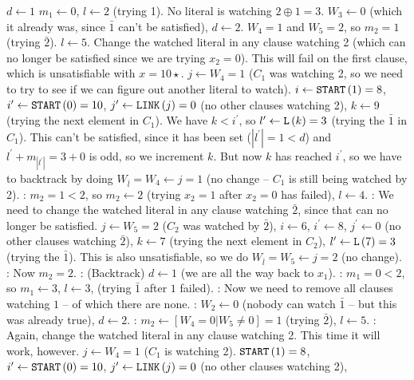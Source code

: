  $d \gets 1$
 $m_1 \gets 0$, $l \gets 2$ (trying 1).
 No literal is watching $2 \oplus 1 = 3$.
 $W_3 \gets 0$ (which it already was, since $\bar 1$
can't be satisfied), $d \gets 2$.
 $W_4 = 1$ and $W_5 = 2$, so $m_2 = 1$ (trying $\bar 2$).
  $l \gets 5$.
 Change the watched literal in any clause watching 2
(which can no longer be satisfied since we are trying $x_2 = 0$).
This will fail on the first clause, which is unsatisfiable with $x=10\star$.
$j \gets W_4 = 1$ ($C_1$ was watching 2, so we need to try to 
see if we can figure out another literal to watch). $i \gets 
{\tt START}\left(1\right) = 8$, $i^{\prime} \gets {\tt START}\left(0\right) = 10$,
$j^{\prime} \gets {\tt LINK}\left(j\right) = 0$ (no other clauses watching 2),
$k \gets 9$ (trying the next element in $C_1$).  We have $k < i^{\prime}$,
so $l^{\prime} \gets {\tt L}\left(k\right) = 3$ (trying the $\bar 1$ in $C_1$).  This
can't be satisfied, since it has been set ($\left| l^{\prime} \right| = 1 < d$)
and $l^{\prime} + m_{\left| l^{\prime} \right|} = 3 + 0$ is odd, so we increment $k$.
But now $k$ has reached $i^{\prime}$, so we have to backtrack by
doing $W_{\bar l} = W_4 \gets j = 1$ (no change -- $C_1$ is still being
watched by 2).
: $m_2 = 1 < 2$, so $m_2 \gets 2$ (trying $x_2 = 1$ after
$x_2 = 0$ has failed), $l \gets 4$.
: We need to change the watched literal in any clause watching $\bar 2$,
since that can no longer be satisfied.  $j \gets W_5 = 2$ ($C_2$ was watched
by $\bar 2$), $i \gets 6$, $i^{\prime} \gets 8$, $j^{\prime} \gets 0$ (no other
clauses watching $\bar 2$), $k \gets 7$ (trying the next element in $C_2$),
$l^{\prime} \gets {\tt L}\left(7\right) = 3$ (trying the $\bar 1$).  This
is also unsatisfiable, so we do $W_{\bar l} = W_5 \gets j = 2$ (no change).
: Now $m_2 = 2$.
: (Backtrack) $d \gets 1$ (we are all the way back to $x_1$).
: $m_1 = 0 < 2$, so $m_1 \gets 3$, $l \gets 3$, (trying $\bar 1$ after $1$ failed).
: Now we need to remove all clauses watching $1$ -- of which there
 are none.
: $W_2 \gets 0$ (nobody can watch $\bar 1$ -- but this was already true),
 $d \gets 2$.
: $m_2 \gets \left[ W_4 = 0 | W_5 \ne 0 \right] = 1$ (trying $\bar 2$),
$l \gets 5$.
: Again, change the watched literal in any clause watching 2.
This time it will work, however. $j \gets W_4 = 1$ ($C_1$ is watching 2).
${\tt START}\left(1\right) = 8$, $i^{\prime} \gets {\tt START}\left(0\right) = 10$,
$j^{\prime} \gets {\tt LINK}\left(j\right) = 0$ (no other clauses watching 2),
